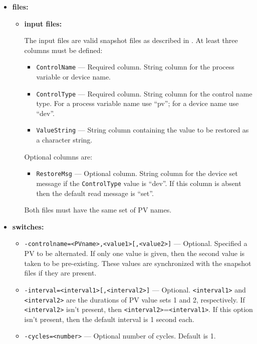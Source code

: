 \begin{itemize}
\item {\bf files:}
\begin{itemize}
\item {\bf input files:}\par
The input files are valid snapshot files as described in . At least three
columns must be defined:
\begin{itemize}
        \item {\tt ControlName} --- Required column. String column for the process variable or device name.
        \item {\tt ControlType} --- Required column. String column for the control name type. For a 
                process variable name use ``pv''; for a device name use ``dev''.
        \item {\tt ValueString} --- String column containing the value to be restored as a character string.
\end{itemize}
Optional columns are:
\begin{itemize}
        \item {\tt RestoreMsg} --- Optional column. String column for the device set message if 
                the {\tt ControlType} value is ``dev''.
                If this column is absent then the default read message is ``set''.
\end{itemize}
        Both files must have the same set of PV names.
\end{itemize}
%
\item {\bf switches:}
%
%
    \begin{itemize}
%
%
        \item {\tt -controlname=<PVname>,<value1>[,<value2>]} --- Optional. Specified a PV to be 
                alternated. If only one value is given, then the second value
                is taken to be pre-existing. These values are synchronized with
                the snapshot files if they are present.
        \item {\tt -interval=<interval1>[,<interval2>]} ---  Optional. \verb+<interval1>+ and \verb+<interval2>+
                 are the durations of PV value sets 1 and 2, respectively.
                 If \verb+<interval2>+ isn't present, then \verb+<interval2>+=\verb+<interval1>+.
                 If this option isn't present, then the default interval is 1 second each.
        \item {\tt -cycles=<number>} --- Optional number of cycles. Default is 1.

\end{itemize}
\end{itemize}
